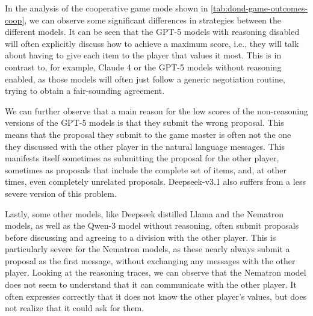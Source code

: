 \documentclass[../main.tex]{subfiles}
\begin{document}
In the analysis of the cooperative game mode shown in \cref{tab:dond-game-outcomes-coop}, we can observe some significant differences in strategies between the different models. It can be seen that the GPT-5 models with reasoning disabled will often explicitly discuss how to achieve a maximum score, i.e., they will talk about having to give each item to the player that values it most. This is in contrast to, for example, Claude 4 or the GPT-5 models without reasoning enabled, as those models will often just follow a generic negotiation routine, trying to obtain a fair-sounding agreement.

We can further observe that a main reason for the low scores of the non-reasoning versions of the GPT-5 models is that they submit the wrong proposal. This means that the proposal they submit to the game master is often not the one they discussed with the other player in the natural language messages. This manifests itself sometimes as submitting the proposal for the other player, sometimes as proposals that include the complete set of items, and, at other times, even completely unrelated proposals. Deepseek-v3.1 also suffers from a less severe version of this problem.

Lastly, some other models, like Deepseek distilled Llama and the Nematron models, as well as the Qwen-3 model without reasoning, often submit proposals before discussing and agreeing to a division with the other player. This is particularly severe for the Nematron models, as these nearly always submit a proposal as the first message, without exchanging any messages with the other player. Looking at the reasoning traces, we can observe that the Nematron model does not seem to understand that it can communicate with the other player. It often expresses correctly that it does not know the other player's values, but does not realize that it could ask for them.
\end{document}
